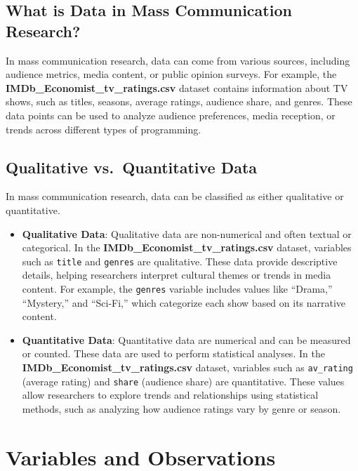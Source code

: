 \documentclass[
]{book}
\begin{document}
\subsection*{What is Data in Mass Communication Research?}\label{what-is-data-in-mass-communication-research}

In mass communication research, data can come from various sources, including audience metrics, media content, or public opinion surveys. For example, the \textbf{IMDb\_Economist\_tv\_ratings.csv} dataset contains information about TV shows, such as titles, seasons, average ratings, audience share, and genres. These data points can be used to analyze audience preferences, media reception, or trends across different types of programming.

\subsection*{Qualitative vs.~Quantitative Data}\label{qualitative-vs.-quantitative-data}

In mass communication research, data can be classified as either qualitative or quantitative.

\begin{itemize}
\item
  \textbf{Qualitative Data}: Qualitative data are non-numerical and often textual or categorical. In the \textbf{IMDb\_Economist\_tv\_ratings.csv} dataset, variables such as \texttt{title} and \texttt{genres} are qualitative. These data provide descriptive details, helping researchers interpret cultural themes or trends in media content. For example, the \texttt{genres} variable includes values like ``Drama,'' ``Mystery,'' and ``Sci-Fi,'' which categorize each show based on its narrative content.
\item
  \textbf{Quantitative Data}: Quantitative data are numerical and can be measured or counted. These data are used to perform statistical analyses. In the \textbf{IMDb\_Economist\_tv\_ratings.csv} dataset, variables such as \texttt{av\_rating} (average rating) and \texttt{share} (audience share) are quantitative. These values allow researchers to explore trends and relationships using statistical methods, such as analyzing how audience ratings vary by genre or season.
\end{itemize}

\section{Variables and Observations}\label{variables-and-observations}
\end{document}
